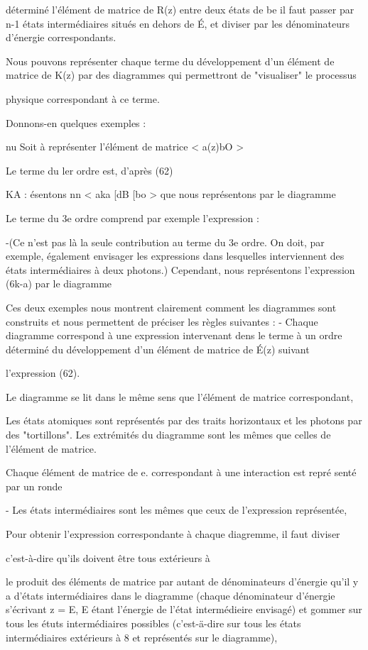 déterminé l'élément de matrice de R(z) entre deux états de be il faut passer
par n-1 états intermédiaires situés en dehors de É, et diviser par les dénominateurs d'énergie correspondants.

Nous pouvons représenter chaque terme du développement d'un élément
de matrice de K(z) par des diagrammes qui permettront de "visualiser" le processus

physique correspondant à ce terme.

Donnons-en quelques exemples :

nu
Soit à représenter l'élément de matrice < a(z)bO >

Le terme du ler ordre est, d'après (62)

KA
: ésentons nn
< aka [dB [bo > que nous représentons par le diagramme

Le terme du 3e ordre comprend par exemple l'expression :

-(Ce n'est pas là la seule contribution au terme du 3e ordre.
On doit, par exemple, également envisager les expressions dans lesquelles
interviennent des états intermédiaires à deux photons.)
Cependant, nous représentons l'expression (6k-a) par le diagramme

Ces deux exemples nous montrent clairement comment les diagrammes sont construits et nous permettent de préciser les règles suivantes :
- Chaque diagramme correspond à une expression intervenant dens le terme à un
ordre déterminé du développement d'un élément de matrice de É(z) suivant

l'expression (62).

Le diagramme se lit dans le même sens que l'élément de matrice correspondant,

Les états atomiques sont représentés par des traits horizontaux et les photons
par des "tortillons".
Les extrémités du diagramme sont les mêmes que celles de l'élément de matrice.

Chaque élément de matrice de e. correspondant à une interaction est repré
senté par un ronde

- Les états intermédiaires sont les mêmes que ceux de l'expression représentée,

Pour obtenir l'expression correspondante à chaque diagremme, il faut diviser

c'est-à-dire qu'ils doivent être tous extérieurs à

le produit des éléments de matrice par autant de dénominateurs d'énergie qu'il
y a d'états intermédiaires dans le diagramme (chaque dénominateur d'énergie
s'écrivant z = E, E étant l'énergie de l'état intermédieire envisagé) et
gommer sur tous les étuts intermédiaires possibles (c'est-ä-dire sur tous les
états intermédiaires extérieurs à 8 et représentés sur le diagramme),

